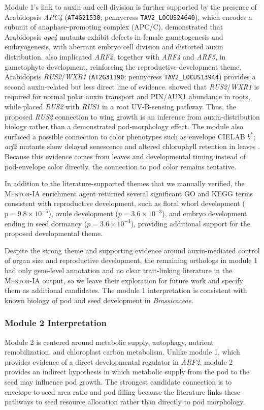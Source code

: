 Module 1's link to auxin and cell division is further supported by the presence of Arabidopsis \textit{APC4} (\texttt{AT4G21530}; pennycress \texttt{TAV2\_LOCUS24640}), which encodes a subunit of anaphase-promoting complex (APC/C). \cite{wang2012apc4} demonstrated that Arabidopsis \textit{apc4} mutants exhibit defects in female gametogenesis and embryogenesis, with aberrant embryo cell division and distorted auxin distribution. \cite{liu2018arf} also implicated \textit{ARF2}, together with \textit{ARF4} and \textit{ARF5}, in gametophyte development, reinforcing the reproductive-development theme. Arabidopsis \textit{RUS2}/\textit{WXR1} (\texttt{AT2G31190}; pennycress \texttt{TAV2\_LOCUS13944}) provides a second auxin-related but less direct line of evidence. \cite{ge2010} showed that \textit{RUS2}/\textit{WXR1} is required for normal polar auxin transport and PIN/AUX1 abundance in roots, while \cite{leasure2009} placed \textit{RUS2} with \textit{RUS1} in a root UV-B-sensing pathway. Thus, the proposed \textit{RUS2} connection to wing growth is an inference from auxin-distribution biology rather than a demonstrated pod-morphology effect. The module also surfaced a possible connection to color phenotypes such as envelope CIELAB $b^*$; \textit{arf2} mutants show delayed senescence and altered chlorophyll retention in leaves \cite{ellis2005}. Because this evidence comes from leaves and developmental timing instead of pod-envelope color directly, the connection to pod color remains tentative.

In addition to the literature-supported themes that we manually verified, the \textsc{Mentor-IA} enrichment agent returned several significant GO and KEGG terms consistent with reproductive development, such as floral whorl development ($p = 9.8 \times 10^{-5}$), ovule development ($p = 3.6 \times 10^{-3}$), and embryo development ending in seed dormancy ($p = 3.6 \times 10^{-3}$), providing additional support for the proposed developmental theme.

Despite the strong theme and supporting evidence around auxin-mediated control of organ size and reproductive development, the remaining orthologs in module 1 had only gene-level annotation and no clear trait-linking literature in the \textsc{Mentor-IA} output, so we leave their exploration for future work and specify them as additional candidates. The module 1 interpretation is consistent with known biology of pod and seed development in \textit{Brassicaceae}.

\subsubsection{Module 2 Interpretation}
Module 2 is centered around metabolic supply, autophagy, nutrient remobilization, and chloroplast carbon metabolism. Unlike module 1, which provides evidence of a direct developmental regulator in \textit{ARF2}, module 2 provides an indirect hypothesis in which metabolic supply from the pod to the seed may influence pod growth. The strongest candidate connection is to envelope-to-seed area ratio and pod filling because the literature links these pathways to seed resource allocation rather than directly to pod morphology.

